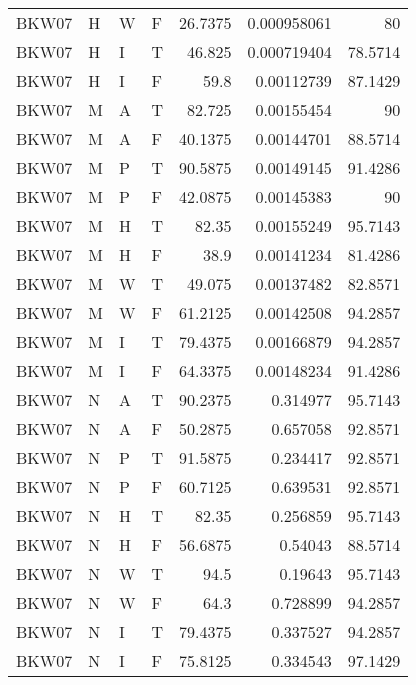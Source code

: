 \begin{table}[htb!]
{\begin{tabular}{llllrrr}
            BKW07    & H     & W     & F          & 26.7375    & 0.000958061 & 80       \\
            BKW07    & H     & I     & T          & 46.825     & 0.000719404 & 78.5714  \\
            BKW07    & H     & I     & F          & 59.8       & 0.00112739  & 87.1429  \\
            BKW07    & M     & A     & T          & 82.725     & 0.00155454  & 90       \\
            BKW07    & M     & A     & F          & 40.1375    & 0.00144701  & 88.5714  \\
            BKW07    & M     & P     & T          & 90.5875    & 0.00149145  & 91.4286  \\
            BKW07    & M     & P     & F          & 42.0875    & 0.00145383  & 90       \\
            BKW07    & M     & H     & T          & 82.35      & 0.00155249  & 95.7143  \\
            BKW07    & M     & H     & F          & 38.9       & 0.00141234  & 81.4286  \\
            BKW07    & M     & W     & T          & 49.075     & 0.00137482  & 82.8571  \\
            BKW07    & M     & W     & F          & 61.2125    & 0.00142508  & 94.2857  \\
            BKW07    & M     & I     & T          & 79.4375    & 0.00166879  & 94.2857  \\
            BKW07    & M     & I     & F          & 64.3375    & 0.00148234  & 91.4286  \\
            BKW07    & N     & A     & T          & 90.2375    & 0.314977    & 95.7143  \\
            BKW07    & N     & A     & F          & 50.2875    & 0.657058    & 92.8571  \\
            BKW07    & N     & P     & T          & 91.5875    & 0.234417    & 92.8571  \\
            BKW07    & N     & P     & F          & 60.7125    & 0.639531    & 92.8571  \\
            BKW07    & N     & H     & T          & 82.35      & 0.256859    & 95.7143  \\
            BKW07    & N     & H     & F          & 56.6875    & 0.54043     & 88.5714  \\
            BKW07    & N     & W     & T          & 94.5       & 0.19643     & 95.7143  \\
            BKW07    & N     & W     & F          & 64.3       & 0.728899    & 94.2857  \\
            BKW07    & N     & I     & T          & 79.4375    & 0.337527    & 94.2857  \\
            BKW07    & N     & I     & F          & 75.8125    & 0.334543    & 97.1429  \\
            \hline
        \end{tabular}
    }{
    }
\end{table} 
